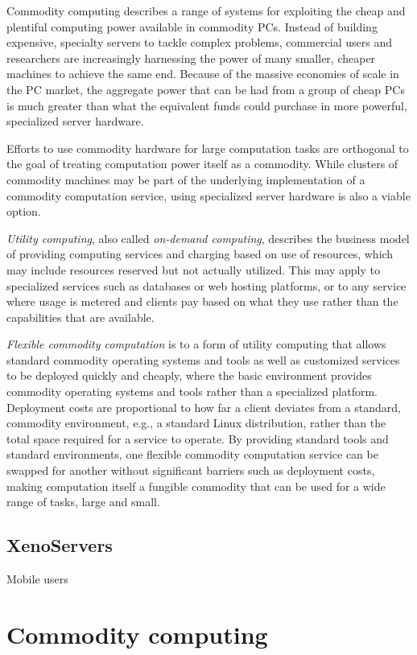 Commodity computing describes a range of systems for exploiting the cheap and plentiful computing power available in commodity PCs. Instead of building expensive, specialty servers to tackle complex problems, commercial users and researchers are increasingly harnessing the power of many smaller, cheaper machines to achieve the same end. Because of the massive economies of scale in the PC market, the aggregate power that can be had from a group of cheap PCs is much greater than what the equivalent funds could purchase in more powerful, specialized server hardware.

Efforts to use commodity hardware for large computation tasks are orthogonal to the goal of treating computation power itself as a commodity. While clusters of commodity machines may be part of the underlying implementation of a commodity computation service, using specialized server hardware is also a viable option.

\emph{Utility computing}, also called \emph{on-demand computing}, describes the business model of providing computing services and charging based on use of resources, which may include resources reserved but not actually utilized. This may apply to specialized services such as databases or web hosting platforms, or to any service where usage is metered and clients pay based on what they use rather than the capabilities that are available.

\emph{Flexible commodity computation} is to a form of utility computing that allows standard commodity operating systems and tools as well as customized services to be deployed quickly and cheaply, where the basic environment provides commodity operating systems and tools rather than a specialized platform. Deployment costs are proportional to how far a client deviates from a standard, commodity environment, e.g., a standard Linux distribution, rather than the total space required for a service to operate. By providing standard tools and standard environments, one flexible commodity computation service can be swapped for another without significant barriers such as deployment costs, making computation itself a fungible commodity that can be used for a wide range of tasks, large and small.

\subsection{XenoServers}

Mobile users \cite{demers}

\section{Commodity computing}

